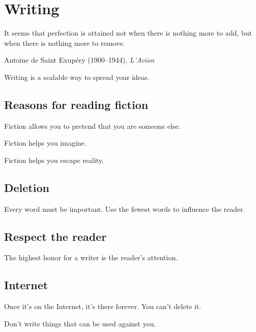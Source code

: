\chapter{Writing}

\epigraph{It seems that perfection is attained not when there is nothing more to add, but when there is nothing more to remove.}{Antoine de Saint Exup\'ery (1900--1944), \emph{L'Avion}}

Writing is a scalable way to spread your ideas.

\section{Reasons for reading fiction}

Fiction allows you to pretend that you are someone else.

Fiction helps you imagine.

Fiction helps you escape reality.

\section{Deletion}

Every word must be important.
Use the fewest words to influence the reader.

\section{Respect the reader}

The highest honor for a writer is the reader's attention.

\section{Internet}

Once it's on the Internet, it's there forever.
You can't delete it.

Don't write things that can be used against you.
